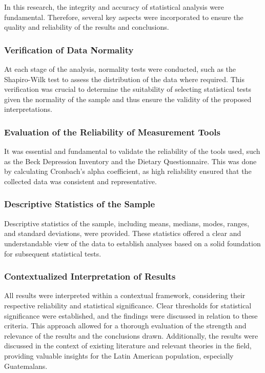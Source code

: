 \documentclass[jou]{apa7}
\begin{document}
In this research, the integrity and accuracy of statistical analysis were fundamental. Therefore, several key aspects were incorporated to ensure the quality and reliability of the results and conclusions.

\subsubsection{Verification of Data Normality}
At each stage of the analysis, normality tests were conducted, such as the Shapiro-Wilk test to assess the distribution of the data where required. This verification was crucial to determine the suitability of selecting statistical tests given the normality of the sample and thus ensure the validity of the proposed interpretations.

\subsubsection{Evaluation of the Reliability of Measurement Tools}
It was essential and fundamental to validate the reliability of the tools used, such as the Beck Depression Inventory and the Dietary Questionnaire. This was done by calculating Cronbach's alpha coefficient, as high reliability ensured that the collected data was consistent and representative.

\subsubsection{Descriptive Statistics of the Sample}
Descriptive statistics of the sample, including means, medians, modes, ranges, and standard deviations, were provided. These statistics offered a clear and understandable view of the data to establish analyses based on a solid foundation for subsequent statistical tests.

\subsubsection{Contextualized Interpretation of Results}
All results were interpreted within a contextual framework, considering their respective reliability and statistical significance. Clear thresholds for statistical significance were established, and the findings were discussed in relation to these criteria. This approach allowed for a thorough evaluation of the strength and relevance of the results and the conclusions drawn. Additionally, the results were discussed in the context of existing literature and relevant theories in the field, providing valuable insights for the Latin American population, especially Guatemalans.
\end{document}
